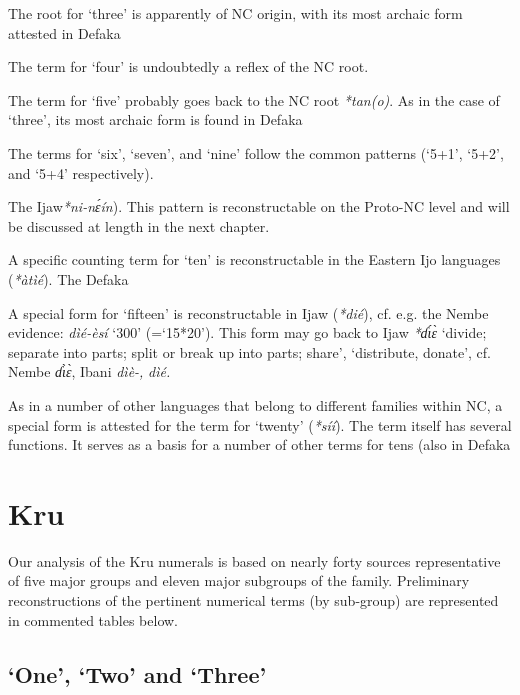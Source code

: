 {The root for ‘three’ is apparently of NC origin, with its most archaic form attested in Defaka}

{The term for ‘four’ is undoubtedly a reflex of the NC root.}

{The term for ‘five’ probably goes back to the NC root} {\textit{*tan(o)}}{. As in the case of ‘three’, its most archaic form is found in Defaka}

{The terms for ‘six’, ‘seven’, and ‘nine’ follow the common patterns (‘5+1’, ‘5+2’, and ‘5+4’ respectively).} 

{The Ijaw}\textit{*ni-n{\'{ɛ}}ín}). This pattern is reconstructable on the Proto-NC level and will be discussed at length in the next chapter.

{A specific counting term for ‘ten’ is reconstructable in the Eastern Ijo languages (}{\textit{*}}\textit{àtìé}{). The Defaka}

A special form for ‘fifteen’ is reconstructable in Ijaw (\textit{*dié}), cf. e.g. the Nembe evidence: \textit{dì}\textit{é-}\textit{è}\textit{sí} `300’ (=‘15*20’). This form may go back to Ijaw \textit{*ɗ{\'{ɩ}}{\`{ɛ}}} ‘divide; separate into parts; split or break up into parts; share’, ‘distribute, donate’, cf. Nembe \textit{ɗ{\`{ɩ}}{\`{ɛ}}}, Ibani \citep{Koelle1963} \textit{dìè-,} \textit{dìé.}

{As in a number of other languages that belong to different families within NC, a special form is attested for the term for ‘twenty’ (}\textit{*síí}{). The term itself has several functions. It serves as a basis for a number of other terms for tens (also in Defaka} 

\section{Kru}%

Our analysis of the Kru numerals is based on nearly forty sources representative of five major groups and eleven major subgroups of the family. Preliminary reconstructions of the pertinent numerical terms (by sub-group) are represented in commented tables below. 


\subsection{‘One’, ‘Two’ and ‘Three’} %

